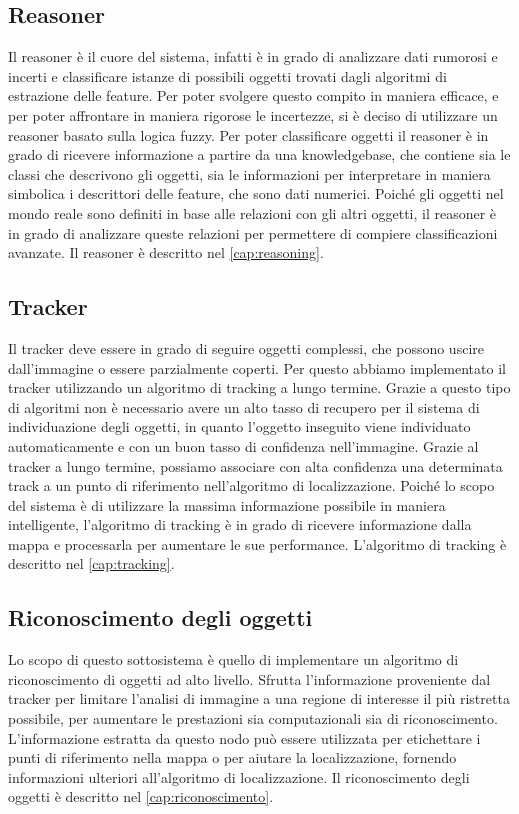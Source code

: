 \subsection{Reasoner}
Il reasoner è il cuore del sistema, infatti è in grado di analizzare dati rumorosi e incerti e classificare istanze di possibili oggetti trovati dagli algoritmi di estrazione delle feature. Per poter svolgere questo compito in maniera efficace, e per poter affrontare in maniera rigorose le incertezze, si è deciso di utilizzare un reasoner basato sulla logica fuzzy.
Per poter classificare oggetti il reasoner è in grado di ricevere informazione a partire da una knowledgebase, che contiene sia le classi che descrivono gli oggetti, sia le informazioni per interpretare in maniera simbolica i descrittori delle feature, che sono dati numerici. 
Poiché gli oggetti nel mondo reale sono definiti in base alle relazioni con gli altri oggetti, il reasoner è in grado di analizzare queste relazioni per permettere di compiere classificazioni avanzate.
Il reasoner è descritto nel \autoref{cap:reasoning}.

\subsection{Tracker}
Il tracker deve essere in grado di seguire oggetti complessi, che possono uscire dall'immagine o essere parzialmente coperti. Per questo abbiamo implementato il tracker utilizzando un algoritmo di tracking a lungo termine. Grazie a questo tipo di algoritmi non è necessario avere un alto tasso di recupero per il sistema di individuazione degli oggetti, in quanto l'oggetto inseguito viene individuato automaticamente e con un buon tasso di confidenza nell'immagine. Grazie al tracker a lungo termine, possiamo associare con alta confidenza una determinata track a un punto di riferimento nell'algoritmo di localizzazione.
Poiché lo scopo del sistema è di utilizzare la massima informazione possibile in maniera intelligente, l'algoritmo di tracking è in grado di ricevere informazione dalla mappa e processarla per aumentare le sue performance.
L'algoritmo di tracking è descritto nel \autoref{cap:tracking}.


\subsection{Riconoscimento degli oggetti}
Lo scopo di questo sottosistema è quello di implementare un algoritmo di riconoscimento di oggetti ad alto livello. Sfrutta l'informazione proveniente dal tracker per limitare l'analisi di immagine a una regione di interesse il più ristretta possibile, per aumentare le prestazioni sia computazionali sia di riconoscimento. L'informazione estratta da questo nodo può essere utilizzata per etichettare i punti di riferimento nella mappa o per aiutare la localizzazione, fornendo informazioni ulteriori all'algoritmo di localizzazione.
Il riconoscimento degli oggetti è descritto nel \autoref{cap:riconoscimento}.

